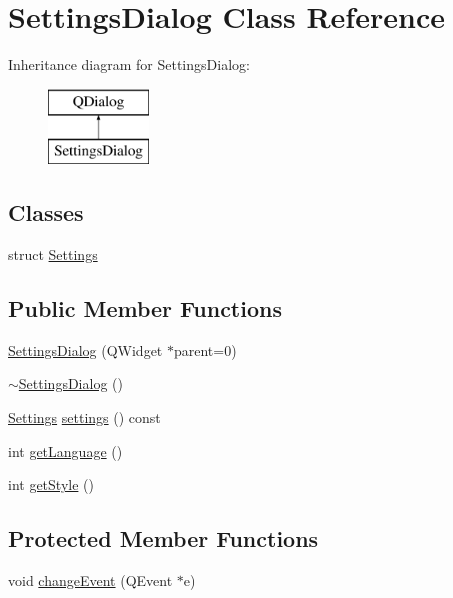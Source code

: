 \hypertarget{class_settings_dialog}{}\section{Settings\+Dialog Class Reference}
\label{class_settings_dialog}
Inheritance diagram for Settings\+Dialog\+:\begin{figure}[H]
\begin{center}
\leavevmode
\includegraphics[height=2.000000cm]{class_settings_dialog}
\end{center}
\end{figure}
\subsection*{Classes}
\begin{DoxyCompactItemize}
\item 
struct \hyperlink{struct_settings_dialog_1_1_settings}{Settings}
\end{DoxyCompactItemize}
\subsection*{Public Member Functions}
\begin{DoxyCompactItemize}
\item 
\hyperlink{class_settings_dialog_a9933956b777b2c0451e9119581cc22fb}{Settings\+Dialog} (Q\+Widget $\ast$parent=0)
\item 
\hyperlink{class_settings_dialog_ac48f54d4472902be0a3845a69167f068}{$\sim$\+Settings\+Dialog} ()
\item 
\hyperlink{struct_settings_dialog_1_1_settings}{Settings} \hyperlink{class_settings_dialog_afeb533d711d0392b9856c63b40b65ad7}{settings} () const 
\item 
int \hyperlink{class_settings_dialog_a67d4687c793b02da6dba1d2cd9bf701c}{get\+Language} ()
\item 
int \hyperlink{class_settings_dialog_a9162f4376c8e3889dabd281428c87337}{get\+Style} ()
\end{DoxyCompactItemize}
\subsection*{Protected Member Functions}
\begin{DoxyCompactItemize}
\item 
void \hyperlink{class_settings_dialog_a0d0670544a7d571840aa54fb4b74aed7}{change\+Event} (Q\+Event $\ast$e)
\end{DoxyCompactItemize}


